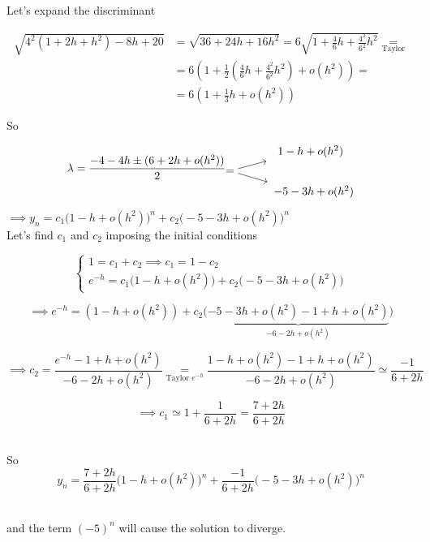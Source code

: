 \begin{example}
    Let's expand the discriminant
    
    \begin{align*}
        \sqrt{4^2(1 + 2h + h^2) - 8h + 20} &= \sqrt{36 + 24h +16h^2} = 6\sqrt{1+\frac{4}{6}h + \frac{4^2}{6^2}h^2} \underset{\text{Taylor}}{=}\\
        &=6\left(1 + \frac{1}{2}\left(\frac{4}{6}h + \frac{4^2}{6^2}h^2\right) + o(h^2)\right) =\\
        &=6\left(1 + \frac{1}{3}h + o(h^2)\right)
    \end{align*}
      
    So
    
    $$
        \lambda = \frac{-4 - 4h \pm (6 + 2h + o(h^2))}{2}
          \begin{tikzcd}[cramped, sep=tiny]
                                    & \hspace{0.6cm}1-h+o(h^2) \\
            = \arrow[ur] \arrow[dr] &            \\
                                    & \hspace{0.8cm}-5-3h + o(h^2)
          \end{tikzcd}
    $$
    
    $\implies y_n = c_1\big(1-h+o(h^2)\big)^n + c_2\big(-5-3h+o(h^2)\big)^n$\\
    
    Let's find $c_1$ and $c_2$ imposing the initial conditions
    
    \[
    \begin{cases}
        1=c_1+c_2 \implies c_1 = 1-c_2 \\
        e^{-h} = c_1\big(1-h+o(h^2)\big) + c_2\big(-5-3h+o(h^2)\big)
    \end{cases}
    \]
    
    \[
       \implies e^{-h} = (1-h+o(h^2)) + c_2\big(\underbrace{-5-3h+o(h^2) - 1 + h + o(h^2)}_{-6-2h+o(h^2)}\big)
    \]
    
    \[
      \implies c_2 = \frac{e^{-h} - 1 + h +o(h^2)}{-6-2h+o(h^2)} \underset{\text{Taylor }e^{-h}}{=} \frac{1-h+o(h^2) - 1 + h +o(h^2)}{-6-2h+o(h^2)} \simeq \frac{-1}{6+2h}
    \]
    
    \[
      \implies c_1 \simeq 1 + \frac{1}{6+2h} = \frac{7+2h}{6+2h}
    \]
    
    \-\\So $$y_n = \frac{7+2h}{6+2h}\big(1-h+o(h^2)\big)^n + \frac{-1}{6+2h}\big(-5-3h+o(h^2)\big)^n$$
    
    \-\\and the term $(-5)^n$ will cause the solution to diverge.
\end{example}